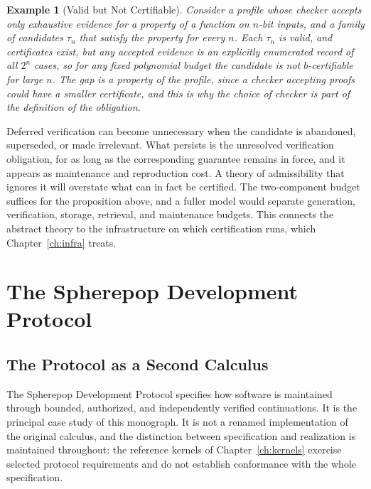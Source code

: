 \documentclass[12pt,oneside,openany]{book}
\theoremstyle{spherepop}
\theoremstyle{remarkstyle}
\newtheorem{example}[definition]{Example}
\begin{document}
\begin{example}[Valid but Not Certifiable]
Consider a profile whose checker accepts only exhaustive evidence for a property of a function on $n$-bit inputs, and a family of candidates $\tau_n$ that satisfy the property for every $n$. Each $\tau_n$ is valid, and certificates exist, but any accepted evidence is an explicitly enumerated record of all $2^n$ cases, so for any fixed polynomial budget the candidate is not $b$-certifiable for large $n$. The gap is a property of the profile, since a checker accepting proofs could have a smaller certificate, and this is why the choice of checker is part of the definition of the obligation.
\end{example}

Deferred verification can become unnecessary when the candidate is abandoned, superseded, or made irrelevant. What persists is the unresolved verification obligation, for as long as the corresponding guarantee remains in force, and it appears as maintenance and reproduction cost. A theory of admissibility that ignores it will overstate what can in fact be certified. The two-component budget suffices for the proposition above, and a fuller model would separate generation, verification, storage, retrieval, and maintenance budgets. This connects the abstract theory to the infrastructure on which certification runs, which Chapter~\ref{ch:infra} treats.

\part{The Spherepop Development Protocol}
\label{part:protocol}

\chapter{The Protocol as a Second Calculus}
\label{ch:protocol}

The Spherepop Development Protocol specifies how software is maintained through bounded, authorized, and independently verified continuations. It is the principal case study of this monograph. It is not a renamed implementation of the original calculus, and the distinction between specification and realization is maintained throughout: the reference kernels of Chapter~\ref{ch:kernels} exercise selected protocol requirements and do not establish conformance with the whole specification.
\end{document}
